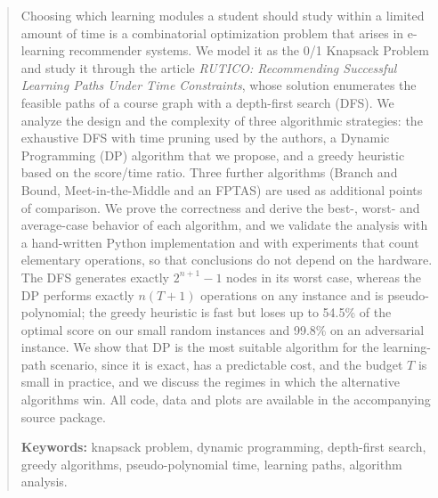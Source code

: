\documentclass[11pt,a4paper]{article}
\theoremstyle{plain}
\theoremstyle{definition}
\theoremstyle{remark}
\renewcommand{\_}{\textunderscore\hspace{0pt}}  %
\begin{document}
\begin{abstract}
\noindent Choosing which learning modules a student should study within a limited amount of time is a combinatorial optimization problem that arises in e-learning recommender systems. We model it as the 0/1 Knapsack Problem and study it through the article \emph{RUTICO: Recommending Successful Learning Paths Under Time Constraints}, whose solution enumerates the feasible paths of a course graph with a depth-first search (DFS). We analyze the design and the complexity of three algorithmic strategies: the exhaustive DFS with time pruning used by the authors, a Dynamic Programming (DP) algorithm that we propose, and a greedy heuristic based on the score/time ratio. Three further algorithms (Branch and Bound, Meet-in-the-Middle and an FPTAS) are used as additional points of comparison. We prove the correctness and derive the best-, worst- and average-case behavior of each algorithm, and we validate the analysis with a hand-written Python implementation and with experiments that count elementary operations, so that conclusions do not depend on the hardware. The DFS generates exactly $2^{n+1}-1$ nodes in its worst case, whereas the DP performs exactly $n(T+1)$ operations on any instance and is pseudo-polynomial; the greedy heuristic is fast but loses up to 54.5\% of the optimal score on our small random instances and 99.8\% on an adversarial instance. We show that DP is the most suitable algorithm for the learning-path scenario, since it is exact, has a predictable cost, and the budget $T$ is small in practice, and we discuss the regimes in which the alternative algorithms win. All code, data and plots are available in the accompanying source package.

\vspace{0.4cm}
\noindent\textbf{Keywords:} knapsack problem, dynamic programming, depth-first search, greedy algorithms, pseudo-polynomial time, learning paths, algorithm analysis.
\end{abstract}

\clearpage
\tableofcontents
\clearpage
{}












\appendix

\end{document}
